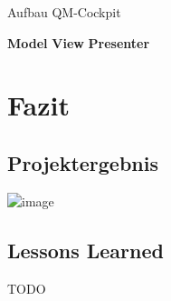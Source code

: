 \begin{frame}{Aufbau QM-Cockpit}
\begin{overlayarea}{\textwidth}{.67\textheight}
 \end{overlayarea}
 \begin{block}{\textbf<2>{Model} \textbf<3>{View} \textbf<4>{Presenter}}\end{block}
\end{frame}

\section{Fazit}
\subsection{Projektergebnis}
\begin{frame}{}
\includegraphics<2->[width=\textwidth]{Balken}
\end{frame}
\subsection{Lessons Learned}
\begin{frame}{}
TODO
\end{frame}



